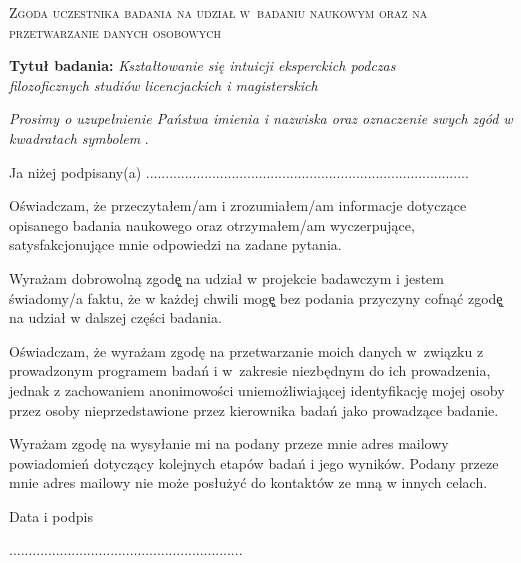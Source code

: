 \documentclass[a4paper, polish, 12pt]{article}
\date{\vspace{-5ex}}
\newcommand{\xmark}{\ding{55}}
\begin{document}
\begin{center}
\textsc{\Large Zgoda uczestnika badania na udział w~badaniu naukowym oraz na przetwarzanie danych osobowych}
\end{center}

\vspace{2em}
\noindent \nohyphens{\textbf{\large Tytuł badania:} \textit{\large Kształtowanie się intuicji eksperckich podczas \\ filozoficznych studiów licencjackich i magisterskich}}

\vspace{2em}

\textit{Prosimy o uzupełnienie Państwa imienia i nazwiska oraz oznaczenie swych zgód w kwadratach symbolem \xmark}.

\vspace{2em}

Ja niżej podpisany(a) ...................................................................................

\begin{terms}
\item Oświadczam, że przeczytałem/am i zrozumiałem/am informacje dotyczące opisanego badania naukowego oraz otrzymałem/am wyczerpujące, satysfakcjonujące mnie odpowiedzi na zadane pytania.

\item Wyrażam dobrowolną zgodę̨ na udział w projekcie badawczym i jestem świadomy/a faktu, że w każdej chwili mogę̨ bez podania przyczyny cofnąć zgodę̨ na udział w dalszej części badania.

\item Oświadczam, że wyrażam zgodę na przetwarzanie moich danych w~związku z prowadzonym programem badań i w~zakresie niezbędnym do ich prowadzenia, jednak z zachowaniem anonimowości uniemożliwiającej identyfikację mojej osoby przez osoby nieprzedstawione przez kierownika badań jako prowadzące badanie.

\item Wyrażam zgodę na wysyłanie mi na podany przeze mnie adres mailowy powiadomień dotyczący kolejnych etapów badań i jego wyników. Podany przeze mnie adres mailowy nie może posłużyć do kontaktów ze mną w innych celach.

\end{terms}

\vspace{2em}

Data i podpis

\vspace{2em}

............................................................
\end{document}
